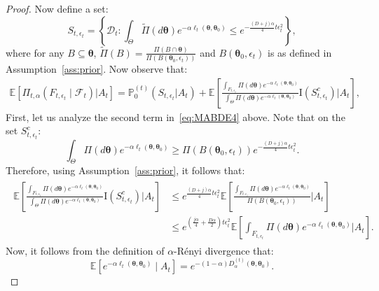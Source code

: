 \documentclass[final,12pt]{colt2026} %
\begin{document}
\begin{proof}
Now define a set:
$$
S_{t,\epsilon_t} = \left\{ \mathcal{D}_t : \int_{\Theta} \tilde \Pi(d\pmb \theta) e^{-\alpha \ell_{t}(\pmb \theta,\pmb \theta_0)} \leq   e^{-\frac{(D+j)\alpha}{4} t\epsilon_t^2}  \right\},
$$
where for any $B\subseteq \pmb \theta$, $\tilde \Pi(B) = \frac{\Pi(B\cap \pmb \theta)}{\Pi(B\left(\pmb \theta_0,\epsilon_t \right))}$ and $B\left(\pmb \theta_0,\epsilon_t \right)$ is as defined in Assumption~\ref{ass:prior}. 
Now observe that:
\begin{align}
\mathbb{E} [\Pi_{t,\alpha}(F_{t,\epsilon_t} \mid \mathcal{F}_{t}) |A_t ] =  \mathbb{P}_0^{(t)} (S_{t,\epsilon_t}  |A_t) + \mathbb{E} \left[  \frac{\int_{F_{t,\epsilon_t}} \Pi(d\pmb \theta) e^{-\alpha \ell_{t}(\pmb \theta,\pmb \theta_0)} } {\int_{\Theta} \Pi(d\pmb \theta) e^{-\alpha \ell_{t}(\pmb \theta,\pmb \theta_0)} } \text{I}(S_{t,\epsilon_t}^c)   |A_t \right],
\label{eq:MABDE4}
\end{align}
First, let us analyze the second term in~\eqref{eq:MABDE4} above. Note that on the set $S_{t,\epsilon_t}^c$:
$$
\int_{\Theta} \Pi(d\pmb \theta) e^{-\alpha \ell_{t}(\pmb \theta,\pmb \theta_0)} \geq \Pi(B\left(\pmb \theta_0,\epsilon_t \right))  e^{-\frac{(D+j)\alpha}{4} t \epsilon_t^2}.
$$
Therefore, using  Assumption~\ref{ass:prior}, it follows that:
\begin{align}\label{eq:MABDE5}
\begin{split}
\mathbb{E} \left[  \frac{\int_{F_{t,\epsilon_t}} \Pi(d\pmb \theta) e^{-\alpha \ell_{t}(\pmb \theta,\pmb \theta_0)} } {\int_{\Theta} \Pi(d\pmb \theta) e^{-\alpha \ell_{t}(\pmb \theta,\pmb \theta_0)}  } \text{I}(S_{t,\epsilon_t}^c) \Big | A_t   \right] &\leq e^{\frac{(D+j)\alpha}{4} t \epsilon_t^2}
 \mathbb{E} \left[  \frac{{\int_{F_{t,\epsilon_t}} \Pi(d\pmb \theta) e^{-\alpha \ell_{t}(\pmb \theta,\pmb \theta_0)}}}{{\Pi(B\left(\pmb \theta_0,\epsilon_t \right)) }} \Big | A_t \right] 
 \\
 &\leq e^{(\frac{j\alpha}{4} + \frac{D\alpha}{2}) t \epsilon_t^2  }
 \mathbb{E} \left[  {\int_{F_{t,\epsilon_t}} \Pi(d\pmb \theta) e^{-\alpha \ell_{t}(\pmb \theta,\pmb \theta_0)}}  \Big | A_t  \right].
\end{split}
\end{align}
Now, it follows from the definition of $\alpha$-R\'enyi divergence that:
$$
\mathbb{E}\left[e^{-\alpha \ell_{t}(\pmb \theta,\pmb \theta_0)} \mid A_t\right]= 
e^{-(1-\alpha) D_{\alpha}^{(t)}(\pmb \theta,\pmb \theta_0)}.
$$
\end{proof}
\end{document}
